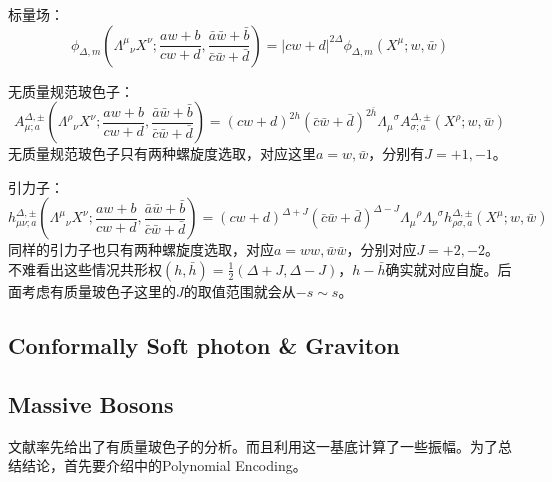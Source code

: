 标量场：
\begin{equation}
	\phi_{\Delta,m}\left(\Lambda^{\mu}{}_{\nu}X^{\nu};\frac{aw+b}{cw+d},\frac{\bar{a}\bar{w}+\bar{b}}{\bar{c}\bar{w}+\bar{d}}\right)=|cw+d|^{2\Delta}\phi_{\Delta,m}(X^{\mu};w,\bar{w})
\end{equation}

无质量规范玻色子：
\begin{equation}
	A_{\mu;a}^{\Delta,\pm}\left({\Lambda^{\rho}}_{\nu}X^{\nu};\frac{aw+b}{cw+d},\frac{\bar{a}\bar{w}+\bar{b}}{\bar{c}\bar{w}+\bar{d}}\right)=(cw+d)^{2h}(\bar{c}\bar{w}+\bar{d})^{2\bar{h}}{\Lambda_{\mu}}^{\sigma}A_{\sigma;a}^{\Delta,\pm}(X^{\rho};w,\bar{w})
\end{equation}
无质量规范玻色子只有两种螺旋度选取，对应这里$a=w,\bar w$，分别有$J=+1,-1$。

引力子：
\begin{equation}
	h_{\mu\nu;a}^{\Delta,\pm}\left(\Lambda^{\mu}{}_{\nu}X^{\nu};\frac{aw+b}{cw+d},\frac{\bar{a}\bar{w}+\bar{b}}{\bar{c}\bar{w}+\bar{d}}\right)=(cw+d)^{\Delta+J}(\bar{c}\bar{w}+\bar{d})^{\Delta-J}{\Lambda_{\mu}}^{\rho}{\Lambda_{\nu}}^{\sigma}h_{\rho\sigma,a}^{\Delta,\pm}(X^{\mu};w,\bar{w})
\end{equation}
同样的引力子也只有两种螺旋度选取，对应$a=ww,\bar w\bar w$，分别对应$J=+2,-2$。
不难看出这些情况共形权$(h,\bar h)=\frac12(\Delta+J,\Delta-J)$，$h-\bar h$确实就对应自旋。后面考虑有质量玻色子这里的$J$的取值范围就会从$-s\sim s$。

\subsection{Conformally Soft photon \& Graviton}
\subsection{Massive Bosons}
文献\cite{Law:2020tsg}率先给出了有质量玻色子的分析。而且利用这一基底计算了一些振幅。为了总结结论，首先要介绍\cite{Costa:2011mg}中的Polynomial Encoding。
